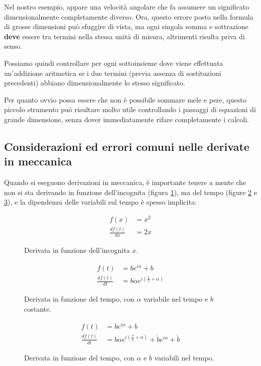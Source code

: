 \documentclass[main.tex]{subfiles}
\begin{document}
Nel nostro esempio, appare una velocità angolare che fa assumere un significato dimensionalmente completamente diverso. Ora, questo errore posto nella formula di grosse dimensioni può sfuggire di vista, ma ogni singola somma e sottrazione \textbf{deve} essere tra termini nella stessa unità di misura, altrimenti risulta priva di senso.

Possiamo quindi controllare per ogni sottoinsieme dove viene effettuata un'addizione aritmetica se i due termini (previa assenza di sostituzioni precedenti) abbiano dimensionalmente lo stesso significato.

Per quanto ovvio possa essere che non è possibile sommare mele e pere, questo piccolo strumento può risultare molto utile controllando i passaggi di equazioni di grande dimensione, senza dover immediatamente rifare completamente i calcoli.

\subsection{Considerazioni ed errori comuni nelle derivate in meccanica}
Quando si eseguono derivazioni in meccanica, è importante tenere a mente che non si sta derivando in funzione dell'incognita (figura \ref{derivazione_incognita}), ma del tempo (figure \ref{derivazione_tempo_1} e \ref{derivazione_tempo_2}), e la dipendenza delle variabili sul tempo è spesso implicita:

\begin{figure}[H]
  \begin{align*}
    f(x) &= x^2 \\
    \frac{df(t)}{dx}  &= 2x
  \end{align*}
  \caption{Derivata in funzione dell'incognita $x$.}
  \label{derivazione_incognita}
\end{figure}

\begin{figure}[H]
  \begin{align*}
    f(t) &= be^{i\alpha} + b \\
    \frac{df(t)}{dt}  &= b\dot{\alpha} e^{i(\frac{\pi}{2}+\alpha)}
  \end{align*}
  \caption{Derivata in funzione del tempo, con $\alpha$ variabile nel tempo e $b$ costante.}
  \label{derivazione_tempo_1}
\end{figure}

\begin{figure}[H]
  \begin{align*}
    f(t) &= be^{i\alpha} + b \\
    \frac{df(t)}{dt} &= b\dot{\alpha} e^{i(\frac{\pi}{2}+\alpha)} +\dot{b}e^{i\alpha} + \dot{b}
  \end{align*}
  \caption{Derivata in funzione del tempo, con $\alpha$ e $b$ variabili nel tempo.}
  \label{derivazione_tempo_2}
\end{figure}
\end{document}
